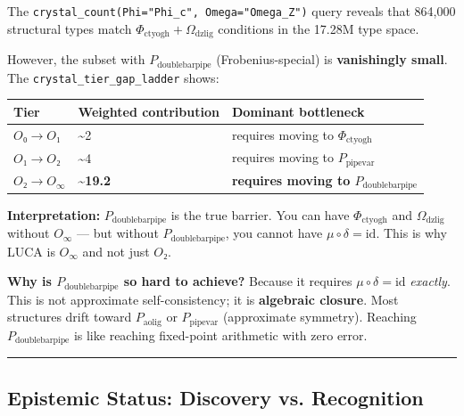 \documentclass[12pt,a4paper]{article}
\begin{document}
The \texttt{crystal\_count(Phi="Phi\_c", Omega="Omega\_Z")} query reveals that 864,000 structural types match $\Phi_{\text{ctyogh}} + \Omega_{\text{dzlig}}$ conditions in the 17.28M type space.

However, the subset with \textbf{$P_{\text{doublebarpipe}}$} (Frobenius-special) is \textbf{vanishingly small}. The \texttt{crystal\_tier\_gap\_ladder} shows:

\begin{table}[htbp]
\centering
\small
{}
\begin{tabularx}{\textwidth}{>{\centering\arraybackslash}X >{\centering\arraybackslash}X >{\centering\arraybackslash}X}
\toprule
\rowcolor{gray!25}\textbf{Tier} & \textbf{Weighted contribution} & \textbf{Dominant bottleneck} \\
\midrule
\rowcolors{1}{white}{gray!10}
$O₀ \to O₁$ & \textasciitilde{}2 & requires moving to $\Phi_{\text{ctyogh}}$ \\
$O₁ \to O₂$ & \textasciitilde{}4 & requires moving to $P_{\text{pipevar}}$ \\
$O₂ \to O_{\infty}$ & \textbf{\textasciitilde{}19.2} & \textbf{requires moving to $P_{\text{doublebarpipe}}$} \\
\bottomrule
\end{tabularx}
\end{table}

\textbf{Interpretation:} $P_{\text{doublebarpipe}}$ is the true barrier. You can have $\Phi_{\text{ctyogh}}$ and $\Omega_{\text{dzlig}}$ without $O_{\infty}$ --- but without $P_{\text{doublebarpipe}}$, you cannot have $\mu \circ \delta = \text{id}$. This is why LUCA is $O_{\infty}$ and not just $O₂$.

\textbf{Why is $P_{\text{doublebarpipe}}$ so hard to achieve?} Because it requires $\mu \circ \delta = \text{id}$ \emph{exactly}. This is not approximate self-consistency; it is \textbf{algebraic closure}. Most structures drift toward $P_{\text{aolig}}$ or $P_{\text{pipevar}}$ (approximate symmetry). Reaching $P_{\text{doublebarpipe}}$ is like reaching fixed-point arithmetic with zero error.

\begin{center}
\rule{0.5\textwidth}{0.4pt}
\end{center}

\subsection{Epistemic Status: Discovery vs. Recognition}
\end{document}
